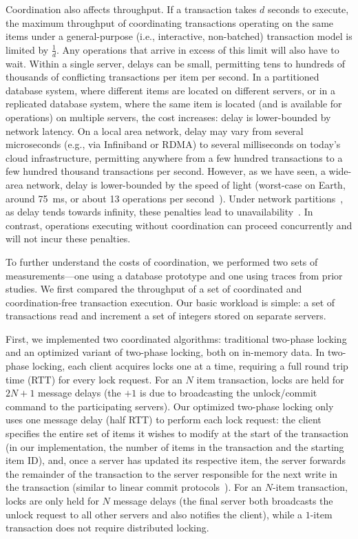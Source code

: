 Coordination also affects throughput. If a transaction takes $d$
seconds to execute, the maximum throughput of coordinating
transactions operating on the same items under a general-purpose
(i.e., interactive, non-batched) transaction model is limited by
$\frac{1}{d}$. Any operations that arrive in excess of this limit will
also have to wait. Within a single server, delays can be small,
permitting tens to hundreds of thousands of conflicting transactions
per item per second. In a partitioned database system, where different
items are located on different servers, or in a replicated database
system, where the same item is located (and is available for
operations) on multiple servers, the cost increases: delay is
lower-bounded by network latency. On a local area network, delay may
vary from several microseconds (e.g., via Infiniband or RDMA) to
several milliseconds on today's cloud infrastructure, permitting
anywhere from a few hundred transactions to a few hundred thousand
transactions per second. However, as we have seen, a wide-area
network, delay is lower-bounded by the speed of light (worst-case on
Earth, around 75~ms, or about 13 operations per
second~\cite{hat-vldb}). Under network
partitions~\cite{queue-partitions}, as delay tends towards infinity,
these penalties lead to unavailability~\cite{gilbert-cap,hat-vldb}. In
contrast, operations executing without coordination can proceed
concurrently and will not incur these penalties.

To further understand the costs of coordination, we performed two sets
of measurements---one using a database prototype and one using traces
from prior studies.  We first compared the throughput of a set of
coordinated and coordination-free transaction execution. Our basic
workload is simple: a set of transactions read and increment a set of
integers stored on separate servers.


First, we implemented two coordinated algorithms: traditional
two-phase locking and an optimized variant of two-phase locking, both
on in-memory data. In two-phase locking, each client acquires locks
one at a time, requiring a full round trip time (RTT) for every lock
request. For an $N$ item transaction, locks are held for $2N+1$
message delays (the $+1$ is due to broadcasting the unlock/commit
command to the participating servers). Our optimized two-phase locking
only uses one message delay (half RTT) to perform each lock request:
the client specifies the entire set of items it wishes to modify at
the start of the transaction (in our implementation, the number of
items in the transaction and the starting item ID), and, once a server
has updated its respective item, the server forwards the remainder of
the transaction to the server responsible for the next write in the
transaction (similar to linear commit
protocols~\cite{bernstein-book}). For an $N$-item transaction, locks
are only held for $N$ message delays (the final server both broadcasts
the unlock request to all other servers and also notifies the client),
while a $1$-item transaction does not require distributed locking.

